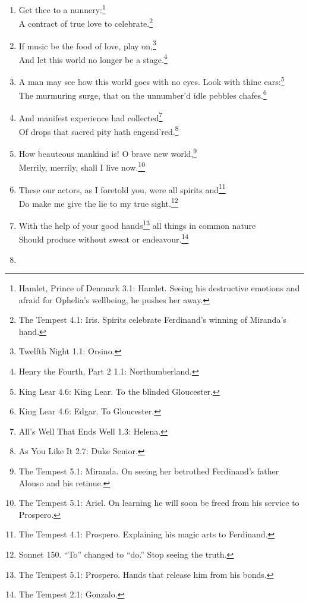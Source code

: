 \documentclass[17pt,twoside]{extarticle}
\begin{document}
\begin{enumerate}
{    after learning that Cordelia has lost the battle in order to rouse
    him. No coming, no going. Present moment.}\\I am a fool to weep at
  what I am glad of.\footnote{The Tempest 2.1: Miranda.}
\item
  Get thee to a nunnery:\footnote{Hamlet, Prince of Denmark 3.1: Hamlet.
    Seeing his destructive emotions and afraid for Ophelia's wellbeing,
    he pushes her away.}\\A contract of true love to
  celebrate.\footnote{The Tempest 4.1: Iris. Spirits celebrate
    Ferdinand's winning of Miranda's hand.}
\item
  If music be the food of love, play on,\footnote{Twelfth Night 1.1:
    Orsino.}\\And let this world no longer be a stage.\footnote{Henry
    the Fourth, Part 2 1.1: Northumberland.}
\item
  A man may see how this world goes with no eyes. Look with thine
  ears:\footnote{King Lear 4.6: King Lear. To the blinded Gloucester.}\\The
  murmuring surge, that on the unnumber'd idle pebbles chafes.\footnote{King
    Lear 4.6: Edgar. To Gloucester.}
\item
  And manifest experience had collected\footnote{All's Well That Ends
    Well 1.3: Helena.}\\Of drops that sacred pity hath
  engend'red.\footnote{As You Like It 2.7: Duke Senior.}
\item
  How beauteous mankind is! O brave new world,\footnote{The Tempest 5.1:
    Miranda. On seeing her betrothed Ferdinand's father Alonso and his
    retinue.}\\Merrily, merrily, shall I live now.\footnote{The Tempest
    5.1: Ariel. On learning he will soon be freed from his service to
    Prospero.}
\item
  These our actors, as I foretold you, were all spirits and\footnote{The
    Tempest 4.1: Prospero. Explaining his magic arts to Ferdinand.}\\Do
  make me give the lie to my true sight.\footnote{Sonnet 150. ``To''
    changed to ``do.'' Stop seeing the truth.}
\item
  With the help of your good hands\footnote{The Tempest 5.1: Prospero.
    Hands that release him from his bonds.} all things in common
  nature\\Should produce without sweat or endeavour.\footnote{The
    Tempest 2.1: Gonzalo.}
\item

\end{enumerate}
\end{document}
